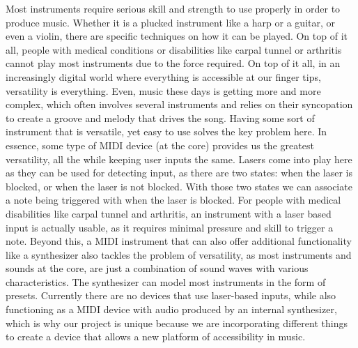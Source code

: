 Most instruments require serious skill and strength to use properly in order to produce music. Whether it is a plucked instrument like a harp or a guitar, or even a violin, there are specific techniques on how it can be played. On top of it all, people with medical conditions or disabilities like carpal tunnel or arthritis cannot play most instruments due to the force required. On top of it all, in an increasingly digital world where everything is accessible at our finger tips, versatility is everything. Even, music these days is getting more and more complex, which often involves several instruments and relies on their syncopation to create a groove and melody that drives the song. Having some sort of instrument that is versatile, yet easy to use solves the key problem here. In essence, some type of MIDI device (at the core) provides us the greatest versatility, all the while keeping user inputs the same. Lasers come into play here as they can be used for detecting input, as there are two states: when the laser is blocked, or when the laser is not blocked. With those two states we can associate a note being triggered with when the laser is blocked. For people with medical disabilities like carpal tunnel and arthritis, an instrument with a laser based input is actually usable, as it requires minimal pressure and skill to trigger a note. Beyond this, a MIDI instrument that can also offer additional functionality like a synthesizer also tackles the problem of versatility, as most instruments and sounds at the core, are just a combination of sound waves with various characteristics. The synthesizer can model most instruments in the form of presets. Currently there are no devices that use laser-based inputs, while also functioning as a MIDI device with audio produced by an internal synthesizer, which is why our project is unique because we are incorporating different things to create a device that allows a new platform of accessibility in music. 
